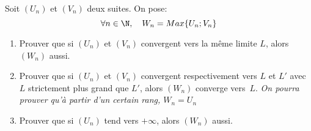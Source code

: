 \begin{exercice}

 \label{Max}Soit $(U_n)$ et $(V_n)$ deux suites. On pose:
\[\forall n\in\N,\quad W_n=Max\{U_n;V_n\}\]
  \begin{enumerate}
  \item Prouver que si $(U_n)$ et $(V_n)$ convergent  vers la m\^eme limite $L$, alors $(W_n)$ aussi.
  \item Prouver que si $(U_n)$ et $(V_n)$ convergent respectivement
  vers $L$ et $L'$ avec $L$ strictement plus grand que $L'$, alors $(W_n)$ converge vers~$L$. \emph{On pourra prouver qu'\`a
  partir d'un certain rang, $W_n=U_n$}

  \item Prouver que si $(U_n)$ tend vers $+\infty$, alors $(W_n)$ aussi.
  \end{enumerate}
\end{exercice}
